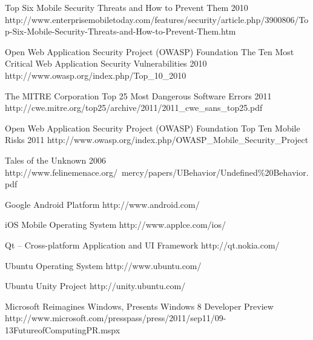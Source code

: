 \begin{thebibliography}{9}
		{}
		{Top Six Mobile Security Threats and How to Prevent Them}
		{2010}
		{http://www.enterprisemobiletoday.com/features/security/article.php/3900806/Top-Six-Mobile-Security-Threats-and-How-to-Prevent-Them.htm}
		
		{Open Web Application Security Project (OWASP) Foundation}
		{The Ten Most Critical Web Application Security Vulnerabilities}
		{2010}
		{http://www.owasp.org/index.php/Top_10_2010}
	
		{The MITRE Corporation}
		{Top 25 Most Dangerous Software Errors}
		{2011}
		{http://cwe.mitre.org/top25/archive/2011/2011_cwe_sans_top25.pdf}
		
		{Open Web Application Security Project (OWASP) Foundation}
		{Top Ten Mobile Risks}
		{2011}
		{http://www.owasp.org/index.php/OWASP_Mobile_Security_Project}


		{Tales of the Unknown}
		{2006}
		{http://www.felinemenace.org/~mercy/papers/UBehavior/Undefined\%20Behavior.pdf}
	

		{Google Android Platform}
		{http://www.android.com/}
	
		{iOS Mobile Operating System}
		{http://www.applce.com/ios/}
		
		{Qt -- Cross-platform Application and UI Framework}
		{http://qt.nokia.com/}
	
		{Ubuntu Operating System}
		{http://www.ubuntu.com/}
		
		{Ubuntu Unity Project}
		{http://unity.ubuntu.com/}
	
		{Microsoft Reimagines Windows, Presents Windows 8 Developer Preview}
		{http://www.microsoft.com/presspass/press/2011/sep11/09-13FutureofComputingPR.mspx}

\end{thebibliography}